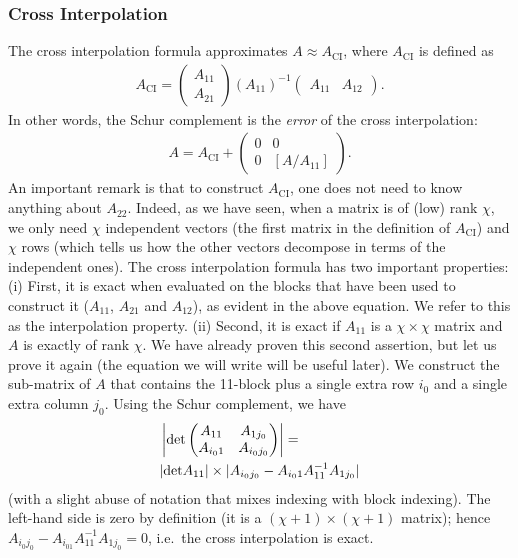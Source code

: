 \documentclass{SciPost}
\begin{document}
\subsubsection{Cross Interpolation}
The cross interpolation formula approximates $A\approx A_{\mathrm{CI}}$, where $A_{\mathrm{CI}}$ is defined as
\begin{align}
A_{\mathrm{CI}}  =
\begin{pmatrix}
A_{11} \\ A_{21} \end{pmatrix}
(A_{11})^{-1}
\begin{pmatrix}
A_{11} & A_{12}
\end{pmatrix}.
\end{align}
In other words, the Schur complement is the \emph{error} of the cross interpolation:
\begin{align}
A = A_{\mathrm{CI}} +
 \begin{pmatrix}
0 & 0 \\ 0 & [A/A_{11}]
\end{pmatrix}.
\end{align}
An important remark is that to construct $A_{\mathrm{CI}}$, one does not need to
know anything about $A_{22}$. Indeed, as we have seen, when a matrix is of (low) rank $\chi$, we only need $\chi$ independent vectors (the first matrix in the definition of
$A_{\mathrm{CI}}$) and $\chi$ rows (which tells us how the other vectors decompose in terms of the independent ones). The cross interpolation formula has two important properties: (i) First, it is exact when evaluated on the blocks that have been used to construct it ($A_{11}$, $A_{21}$ and $A_{12}$), as evident in the above equation. We refer to this as the interpolation property. (ii) Second, it is exact if $A_{11}$ is a $\chi\times\chi$ matrix and $A$ is exactly of rank $\chi$. We have already proven this second assertion, but let us prove it again (the equation we will write will be useful later). We construct the sub-matrix of $A$ that contains the 11-block plus a single extra row $i_0$ and a single extra column $j_0$. Using the Schur complement, we have
\begin{eqnarray}
\label{eq:proof_maxvol}
&\left| {\rm det }
\begin{pmatrix}
A_{11} & A_{1j_0} \\
A_{i_01} & A_{i_0j_0}
\end{pmatrix}
\right| =  \\
&| {\rm det} A_{11} | \times |A_{i_0j_0} - A_{i_01} A_{11}^{-1} A_{1j_0}|\nonumber
\end{eqnarray}
(with a slight abuse of notation that mixes indexing with block indexing). The left-hand side is zero by definition (it is a $(\chi+1)\times (\chi+1)$ matrix); hence $A_{i_0j_0} - A_{i_01} A_{11}^{-1} A_{1j_0} = 0$, i.e.\ the cross interpolation is exact.
\end{document}
